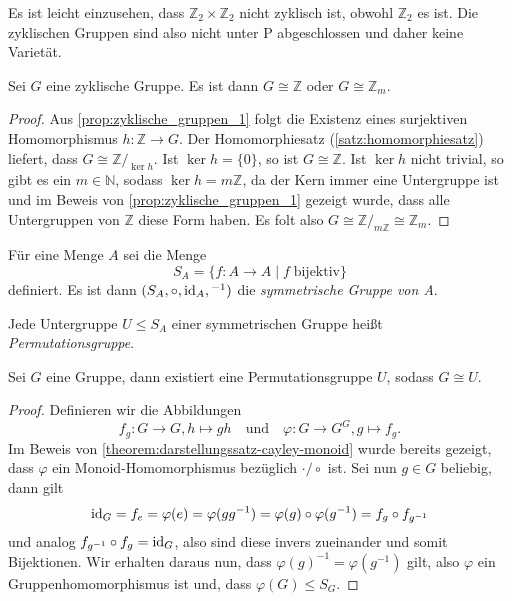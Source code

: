 \begin{remark}
    Es ist leicht einzusehen, dass $\mathbb{Z}_2 \times \mathbb{Z}_2$ nicht zyklisch ist, obwohl $\mathbb{Z}_2$ es ist. Die zyklischen Gruppen sind also nicht unter P abgeschlossen und daher keine Varietät.
\end{remark}

\begin{proposition}
    Sei $G$ eine zyklische Gruppe. Es ist dann $G \cong \mathbb{Z}$ oder $G \cong \mathbb{Z}_m$.
\end{proposition}
\begin{proof}
    Aus \cref{prop:zyklische_gruppen_1} folgt die Existenz eines surjektiven Homomorphismus $h: \mathbb{Z} \to G$. Der Homomorphiesatz (\ref{satz:homomorphiesatz}) liefert, dass $G \cong \mathbb{Z}/_{\ker h}$. Ist $\ker h = \{0\}$, so ist $G \cong \mathbb{Z}$. Ist $\ker h$ nicht trivial, so gibt es ein $m \in \mathbb{N}$, sodass $\ker h = m\mathbb{Z}$, da der Kern immer eine Untergruppe ist und im Beweis von \cref{prop:zyklische_gruppen_1} gezeigt wurde, dass alle Untergruppen von $\mathbb{Z}$ diese Form haben. Es folt also $G \cong \mathbb{Z}/_{m\mathbb{Z}} \cong \mathbb{Z}_m$.
\end{proof}

\begin{definition}
    Für eine Menge $A$ sei die Menge 
    $$ S_A = \{f: A \to A \mid f \;\text{bijektiv}\}$$
    definiert. Es ist dann $(S_A, \circ, \operatorname{id}_A, {}^{-1})$ die \emph{symmetrische Gruppe von A}.

    Jede Untergruppe $U \le S_A$ einer symmetrischen Gruppe heißt \emph{Permutationsgruppe}.
\end{definition}

\begin{theorem}\label{satz:darstellungssatz-cayley-gruppen}
    Sei $G$ eine Gruppe, dann existiert eine Permutationsgruppe $U$, sodass $G \cong U$.
\end{theorem}
\begin{proof}
    Definieren wir die Abbildungen $$f_g: G \to G, h \mapsto gh \quad\text{und}\quad \varphi: G \to G^G, g \mapsto f_g.$$
    Im Beweis von \cref{theorem:darstellungssatz-cayley-monoid} wurde bereits gezeigt, dass $\varphi$ ein Monoid-Homomorphismus bezüglich $\cdot / \circ$ ist. Sei nun $g \in G$ beliebig, dann gilt $$ \operatorname{id}_G = f_e = \varphi(e) = \varphi(g g^{-1}) = \varphi(g) \circ \varphi(g^{-1}) = f_g \circ f_{g^{-1}}$$
    und analog $f_{g^{-1}} \circ f_g = \operatorname{id}_G$, also sind diese invers zueinander und somit Bijektionen. Wir erhalten daraus nun, dass $\varphi(g)^{-1} = \varphi(g^{-1})$ gilt, also $\varphi$ ein Gruppenhomomorphismus ist und, dass $\varphi(G) \le S_G$.
\end{proof}

